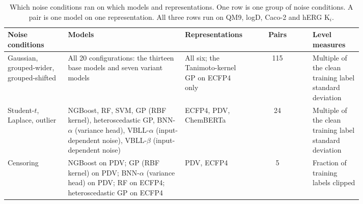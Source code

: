\begin{table}[htbp]
\centering
\small
\caption{Which noise conditions ran on which models and representations. One row is one group of noise conditions. A pair is one model on one representation. All three rows run on QM9, logD, Caco-2 and hERG K$_i$.}
\label{tab:noise_condition_coverage}
\begin{tabular}{>{\raggedright\arraybackslash}p{0.17\linewidth}>{\raggedright\arraybackslash}p{0.33\linewidth}>{\raggedright\arraybackslash}p{0.17\linewidth}c>{\raggedright\arraybackslash}p{0.14\linewidth}}
\toprule
Noise conditions & Models & Representations & Pairs & Level measures \\
\midrule
Gaussian, grouped-wider, grouped-shifted & All 20 configurations: the thirteen base models and seven variant models & All six; the Tanimoto-kernel GP on ECFP4 only & 115 & Multiple of the clean training label standard deviation \\
\addlinespace
Student-$t$, Laplace, outlier & NGBoost, RF, SVM, GP (RBF kernel), heteroscedastic GP, BNN-$\alpha$ (variance head), VBLL-$\alpha$ (input-dependent noise), VBLL-$\beta$ (input-dependent noise) & ECFP4, PDV, ChemBERTa & 24 & Multiple of the clean training label standard deviation \\
\addlinespace
Censoring & NGBoost on PDV; GP (RBF kernel) on PDV; BNN-$\alpha$ (variance head) on PDV; RF on ECFP4; heteroscedastic GP on ECFP4 & PDV, ECFP4 & 5 & Fraction of training labels clipped \\
\bottomrule
\end{tabular}
\end{table}

